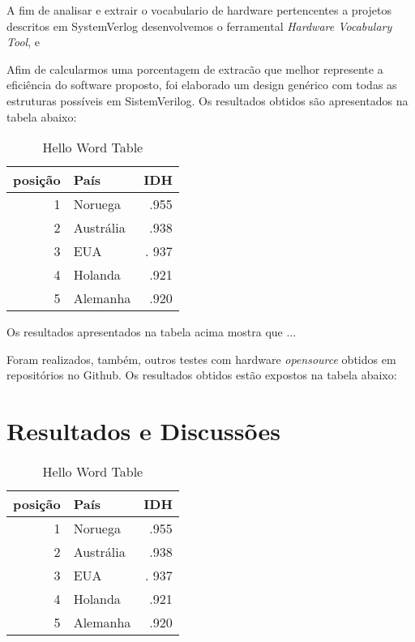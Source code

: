 \documentclass[12pt, twocolumn, a4paper]{article}
\begin{document}
\quad A fim de analisar e extrair o vocabulario de hardware pertencentes a projetos descritos em SystemVerlog desenvolvemos o ferramental \textit{Hardware Vocabulary Tool}, e \cite{AVLSystemVerilog}
	
	
	\quad Afim de calcularmos uma porcentagem de extracão que melhor represente a eficiência do software proposto, foi elaborado um design genérico com todas as estruturas possíveis em SistemVerilog. Os resultados obtidos são apresentados na tabela abaixo:

\begin{table}[h]
\centering
\caption{Hello Word Table}
	\begin{tabular}{r|l|r}
	\hline
	posição & País & IDH\\
	\hline
	1 & Noruega        & .955 \\
	\hline
	2 & Austrália 	   & .938 \\
	\hline
	3 & EUA            &. 937 \\
	\hline
	4 & Holanda        & .921 \\
	\hline
	5 & Alemanha       & .920 \\
	\hline
	
	\end{tabular}

\end{table}

\quad Os resultados apresentados na tabela acima mostra que ...

	Foram realizados, também, outros testes com hardware \textit{opensource} obtidos em repositórios no Github. Os resultados obtidos estão expostos na tabela abaixo:
	\section{Resultados e Discussões}
	
	\begin{table}[h]
\centering
\caption{Hello Word Table}
	\begin{tabular}{r|l|r}
	\hline
	posição & País & IDH\\
	\hline
	1 & Noruega        & .955 \\
	\hline
	2 & Austrália 	   & .938 \\
	\hline
	3 & EUA            &. 937 \\
	\hline
	4 & Holanda        & .921 \\
	\hline
	5 & Alemanha       & .920 \\
	\hline
	
	\end{tabular}

\end{table}
\end{document}
